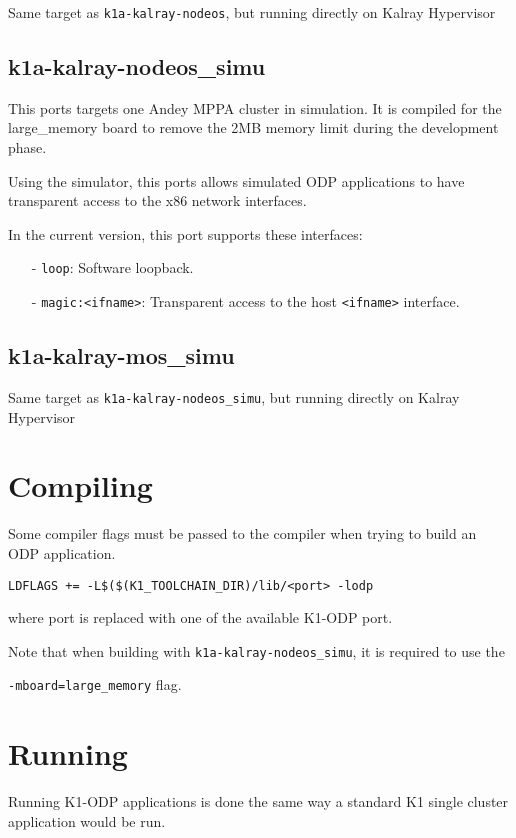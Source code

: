 \documentclass{trkalray}
\begin{document}
Same target as \texttt{k1a-kalray-nodeos}, but running directly on
Kalray Hypervisor

\subsection{k1a-kalray-nodeos\_simu}

This ports targets one Andey MPPA cluster in simulation. It is
compiled for the large\_memory board to remove the 2MB memory limit
during the development phase.

Using the simulator, this ports allows simulated ODP applications to
have transparent access to the x86 network interfaces.

In the current version, this port supports these interfaces:
\begin{itemize}
\item[-]{\texttt{loop}: Software loopback.}
\item[-]{\texttt{magic:<ifname>}: Transparent access to the host
  \texttt{<ifname>} interface.}
\end{itemize}

\subsection{k1a-kalray-mos\_simu}

Same target as \texttt{k1a-kalray-nodeos\_simu}, but running directly on
Kalray Hypervisor

\section{Compiling}

Some compiler flags must be passed to the compiler when trying to
build an ODP application.

\begin{lstlisting}
LDFLAGS += -L$($(K1_TOOLCHAIN_DIR)/lib/<port> -lodp
\end{lstlisting}
where port is replaced with one of the available K1-ODP port.

Note that when building with \texttt{k1a-kalray-nodeos\_simu}, it is
required to use the

 \texttt{-mboard=large\_memory} flag.

\section{Running}

Running K1-ODP applications is done the same way a standard K1 single
cluster application would be run.
\end{document}
